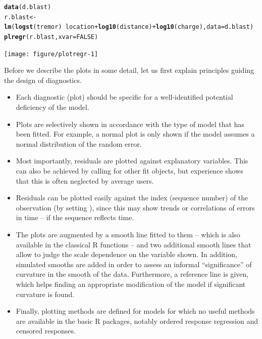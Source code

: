 \documentclass[11pt]{article}\usepackage[]{graphicx}\usepackage[]{color}
\makeatletter
\newcommand{\hlnum}[1]{\textcolor[rgb]{0.686,0.059,0.569}{#1}}%
\newcommand{\hlopt}[1]{\textcolor[rgb]{0,0,0}{#1}}%
\newcommand{\hlstd}[1]{\textcolor[rgb]{0.345,0.345,0.345}{#1}}%
\newcommand{\hlkwb}[1]{\textcolor[rgb]{0.69,0.353,0.396}{#1}}%
\newcommand{\hlkwc}[1]{\textcolor[rgb]{0.333,0.667,0.333}{#1}}%
\newcommand{\hlkwd}[1]{\textcolor[rgb]{0.737,0.353,0.396}{\textbf{#1}}}%
\newenvironment{kframe}{%
 \def\at@end@of@kframe{}%
 \ifinner\ifhmode%
  \def\at@end@of@kframe{\end{minipage}}%
  \begin{minipage}{\columnwidth}%
 \fi\fi%
 \def\FrameCommand##1{\hskip\@totalleftmargin \hskip-\fboxsep
 \colorbox{shadecolor}{##1}\hskip-\fboxsep
     \hskip-\linewidth \hskip-\@totalleftmargin \hskip\columnwidth}%
 \MakeFramed {\advance\hsize-\width
   \@totalleftmargin\z@ \linewidth\hsize
   \@setminipage}}%
 {\par\unskip\endMakeFramed%
 \at@end@of@kframe}
\newenvironment{knitrout}{}{} %
\makeatother
\begin{document}
\begin{knitrout}
\color{fgcolor}\begin{kframe}
\begin{alltt}
\hlkwd{data}\hlstd{(d.blast)}
\hlstd{r.blast} \hlkwb{<-}
  \hlkwd{lm}\hlstd{(}\hlkwd{logst}\hlstd{(tremor)}\hlopt{~}\hlstd{location}\hlopt{+}\hlkwd{log10}\hlstd{(distance)}\hlopt{+}\hlkwd{log10}\hlstd{(charge),} \hlkwc{data}\hlstd{=d.blast)}
\hlkwd{plregr}\hlstd{(r.blast,} \hlkwc{xvar}\hlstd{=}\hlnum{FALSE}\hlstd{)}
\end{alltt}


{\ttfamily\noindent\color{warningcolor}{\#\# Warning in simresiduals.default(x, nrep = lnsims, simfunction = rnorm, sigma = apply(lstdres, : :simresiduals: <=2 residuals found -> No simulated residuals}}\end{kframe}
\texttt{[image: figure/plotregr-1]} 

\end{knitrout}
Before we describe the plots in some detail, let us first explain  
principles guiding the design of diagnostics.
\begin{itemize}
\item
Each diagnostic (plot) should be specific for a well-identified potential 
deficiency of the model.
\item
Plots are selectively shown in accordance with the type of model that has 
been fitted. For example, a normal plot is only shown if the model assumes
a normal distribution of the random error.
\item
Most importantly, residuals are plotted against explanatory variables.
This can also be achieved by calling  for other fit objects,  
but experience shows that this is often neglected by average users.
\item
Residuals can be plotted easily against the index (sequence number) 
of the observation (by setting ), 
since this may show trends or correlations of errors in time --
if the sequence reflects time.
\item
The plots are augmented by a smooth line fitted to them -- which is also
available in the classical R functions -- and two additional smooth lines
that allow to judge the scale dependence on the variable shown.
In addition, simulated smooths are added in order to assess an informal 
``significance'' of curvature in the smooth of the data. 
Furthermore, a reference line is given, which helps finding
an appropriate modification of the model if significant curvature is
found. 
\item
Finally, plotting methods are defined for models for which no useful 
methods are available in the basic R packages, notably ordered response
regression and censored responses.
\end{itemize}
\end{document}
